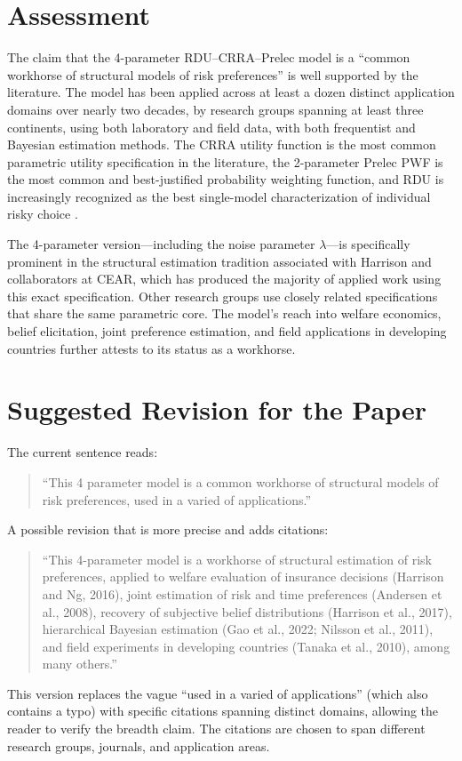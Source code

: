 \documentclass[12pt,a4paper]{article}
\begin{document}
\section{Assessment}

The claim that the 4-parameter RDU--CRRA--Prelec model is a ``common workhorse
of structural models of risk preferences'' is well supported by the literature.
The model has been applied across at least a dozen distinct application domains
over nearly two decades, by research groups spanning at least three continents,
using both laboratory and field data, with both frequentist and Bayesian
estimation methods. The CRRA utility function is the most common parametric
utility specification in the literature, the 2-parameter Prelec PWF is the most
common and best-justified probability weighting function, and RDU is
increasingly recognized as the best single-model characterization of individual
risky choice \parencite{HarrisonSwarthout2023}.

The 4-parameter version---including the noise parameter $\lambda$---is
specifically prominent in the structural estimation tradition associated with
Harrison and collaborators at CEAR, which has produced the majority of applied
work using this exact specification. Other research groups
\parencite{Nilsson2011, Conte2011, Barseghyan2013} use closely related
specifications that share the same parametric core. The model's reach into
welfare economics, belief elicitation, joint preference estimation, and field
applications in developing countries further attests to its status as a
workhorse.

\section{Suggested Revision for the Paper}

The current sentence reads:

\begin{quote}
``This 4 parameter model is a common workhorse of structural models of risk
preferences, used in a varied of applications.''
\end{quote}

A possible revision that is more precise and adds citations:

\begin{quote}
``This 4-parameter model is a workhorse of structural estimation of risk
preferences, applied to welfare evaluation of insurance decisions (Harrison and
Ng, 2016), joint estimation of risk and time preferences (Andersen et al.,
2008), recovery of subjective belief distributions (Harrison et al., 2017),
hierarchical Bayesian estimation (Gao et al., 2022; Nilsson et al., 2011), and
field experiments in developing countries (Tanaka et al., 2010), among many
others.''
\end{quote}

This version replaces the vague ``used in a varied of applications'' (which
also contains a typo) with specific citations spanning distinct domains,
allowing the reader to verify the breadth claim. The citations are chosen to
span different research groups, journals, and application areas.

\printbibliography
\end{document}
